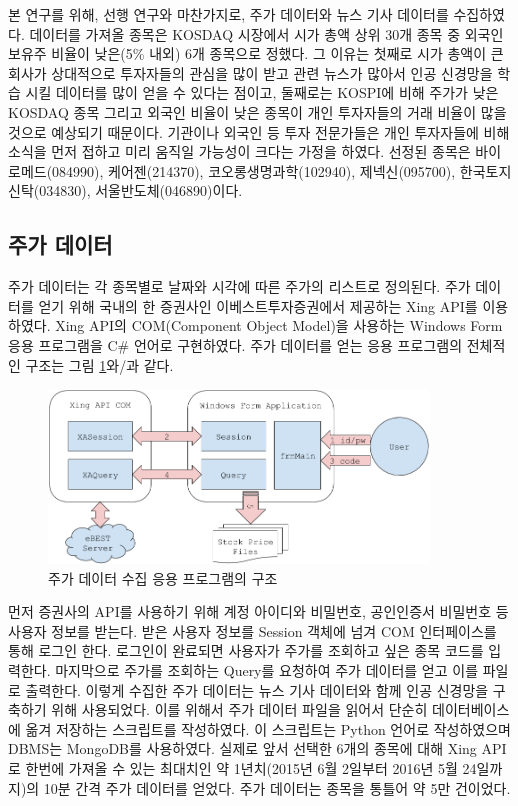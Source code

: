 \documentclass[a4paper,10pt]{article}
\begin{document}
본 연구를 위해, 선행 연구와 마찬가지로, 주가 데이터와 뉴스 기사 데이터를 수집하였다.
데이터를 가져올 종목은 KOSDAQ 시장에서 시가 총액 상위 30개 종목 중 외국인 보유주 비율이 낮은(5\% 내외) 6개 종목으로 정했다.
그 이유는 첫째로 시가 총액이 큰 회사가 상대적으로 투자자들의 관심을 많이 받고 관련 뉴스가 많아서 인공 신경망을 학습 시킬 데이터를 많이 얻을 수 있다는 점이고,
둘째로는 KOSPI에 비해 주가가 낮은 KOSDAQ 종목 그리고 외국인 비율이 낮은 종목이 개인 투자자들의 거래 비율이 많을 것으로 예상되기 때문이다.
기관이나 외국인 등 투자 전문가들은 개인 투자자들에 비해 소식을 먼저 접하고 미리 움직일 가능성이 크다는 가정을 하였다.
선정된 종목은 바이로메드(084990), 케어젠(214370), 코오롱생명과학(102940), 제넥신(095700), 한국토지신탁(034830), 서울반도체(046890)이다.

\subsection{주가 데이터}

주가 데이터는 각 종목별로 날짜와 시각에 따른 주가의 리스트로 정의된다.
주가 데이터를 얻기 위해 국내의 한 증권사인 이베스트투자증권에서 제공하는 Xing API를 이용하였다.
Xing API의 COM(Component Object Model)을 사용하는 Windows Form 응용 프로그램을 C\# 언어로 구현하였다.
주가 데이터를 얻는 응용 프로그램의 전체적인 구조는 그림 \ref{fig:getting_price}와/과 같다.
\begin{figure}[h]
\includegraphics[width=0.9\textwidth]{getting_price}
\centering
\caption{주가 데이터 수집 응용 프로그램의 구조}
\label{fig:getting_price}
\end{figure}
먼저 증권사의 API를 사용하기 위해 계정 아이디와 비밀번호, 공인인증서 비밀번호 등 사용자 정보를 받는다.
받은 사용자 정보를 Session 객체에 넘겨 COM 인터페이스를 통해 로그인 한다.
로그인이 완료되면 사용자가 주가를 조회하고 싶은 종목 코드를 입력한다.
마지막으로 주가를 조회하는 Query를 요청하여 주가 데이터를 얻고 이를 파일로 출력한다.
이렇게 수집한 주가 데이터는 뉴스 기사 데이터와 함께 인공 신경망을 구축하기 위해 사용되었다.
이를 위해서 주가 데이터 파일을 읽어서 단순히 데이터베이스에 옮겨 저장하는 스크립트를 작성하였다.
이 스크립트는 Python 언어로 작성하였으며 DBMS는 MongoDB를 사용하였다.
실제로 앞서 선택한 6개의 종목에 대해 Xing API로 한번에 가져올 수 있는 최대치인 약 1년치(2015년 6월 2일부터 2016년 5월 24일까지)의 10분 간격 주가 데이터를 얻었다.
주가 데이터는 종목을 통틀어 약 5만 건이었다.
\end{document}
